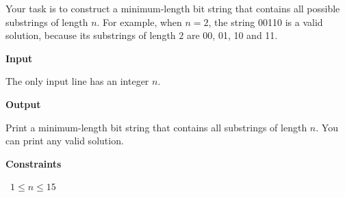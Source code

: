 Your task is to construct a minimum-length bit string that contains all possible substrings of length $n$. For example, when $n=2$, the string 00110 is a valid solution, because its substrings of length $2$ are 00, 01, 10 and 11.

\vspace{0.3cm}\noindent\textbf{Input}

The only input line has an integer $n$.

\vspace{0.3cm}\noindent\textbf{Output}

Print a minimum-length bit string that contains all substrings of length $n$. You can print any valid solution.

\vspace{0.3cm}\noindent\textbf{Constraints}

\textbullet\ $1 \le n \le 15$